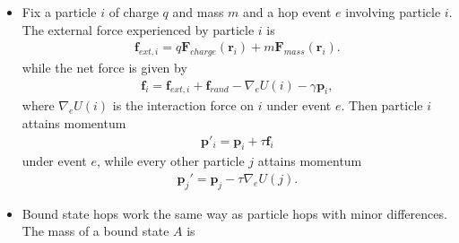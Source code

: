 \documentclass[12pt,letterpaper]{article}
\newcommand{\mb}{\mathbf}
\begin{document}
\begin{itemize}
\begin{align*}
P(\mb{r}_{\tau, \mb{e}} \geqslant D) = 1 - \Phi\left({D - \mu \over \sigma}\right),
\end{align*}
where $\Phi$ is the standard normal CDF,
\begin{align*}
\mu = {f_{\mb{e}} \over m\gamma}\tau + \left({p_{\mb{e}} \over {m}} - {f_{\mb{e}} \over m\gamma}\right){1 - e^{-\gamma\tau} \over \gamma},
\end{align*}
and
\begin{align*}
\sigma^{2} = {1 \over \beta m\gamma^{2}}\left(2\gamma\tau - 4(1 - e^{-\gamma\tau}) + (1 - e^{-2\gamma\tau})\right).
\end{align*}
We have written $v_{\mb{e}}$ for $\mb{e} \cdot \mb{v}$. Note also that we have used $\gamma$ for the viscosity for brevity---it should actually be replaced by the appropriate state-dependent, transition-averaged value for $\gamma$ as defined previously. Then $\nu_{e}$ is the product of the momentum correction and the crossing rate. This concludes the specification of the rates for events involving a change of total energy and position. It remains to define the events themselves, as well as to specify the rates for events that do not involve a change in total energy or position---this includes inelastic collisions and bond flips.
\item Fix a particle $i$ of charge $q$ and mass $m$ and a hop event $e$ involving particle $i$. The external force experienced by particle $i$ is
\begin{align*}
\mb{f}_{ext,i} = q\mb{F}_{charge}(\mb{r}_{i}) + m\mb{F}_{mass}(\mb{r}_{i}).
\end{align*}
while the net force is given by
\begin{align*}
\mb{f}_{i} = \mb{f}_{ext,i} + \mb{f}_{rand} - \nabla_{e}U(i) - \gamma\mb{p}_{i},
\end{align*}
where $\nabla_{e}U(i)$ is the interaction force on $i$ under event $e$. Then particle $i$ attains momentum
\begin{align*}
\mb{p}'_{i} = \mb{p}_{i} + \tau\mb{f}_{i}
\end{align*}
under event $e$, while every other particle $j$ attains momentum
\begin{align*}
\mb{p}_{j}' = \mb{p}_{j} - \tau\nabla_{e}U(j).
\end{align*}
\item Bound state hops work the same way as particle hops with minor differences. The mass of a bound state $A$ is
\begin{align*}

\end{align*}
\end{itemize}
\end{document}
